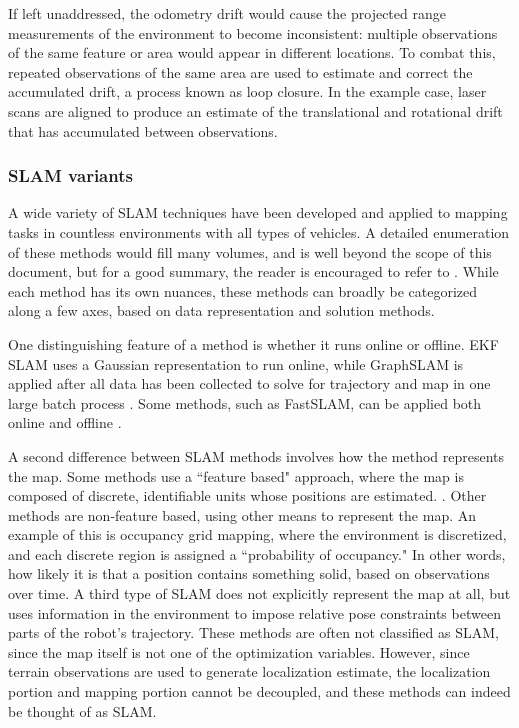 If left unaddressed, the odometry drift would cause the projected range measurements of the environment to become inconsistent: multiple observations of the same feature or area would appear in different locations. To combat this, repeated observations of the same area are used to estimate and correct the accumulated drift, a process known as loop closure. In the example case, laser scans are aligned to produce an estimate of the translational and rotational drift that has accumulated between observations. 


\subsubsection{SLAM variants}

A wide variety of SLAM techniques have been developed and applied to mapping tasks in countless environments with all types of vehicles. A detailed enumeration of these methods would fill many volumes, and is well beyond the scope of this document, but for a good summary, the reader is encouraged to refer to \cite{SLAMoverview}. While each method has its own nuances, these methods can broadly be categorized along a few axes, based on data representation and solution methods. 

One distinguishing feature of a method is whether it runs online or offline. EKF SLAM uses a Gaussian representation to run online, while GraphSLAM is applied after all data has been collected to solve for trajectory and map in one large batch process \cite{Thrun2005}. Some methods, such as FastSLAM, can be applied both online and offline \cite{Montemerlo2002}.

A second difference between SLAM methods involves how the method represents the map. Some methods use a ``feature based" approach, where the map is composed of discrete, identifiable units whose positions are estimated. \cite{?}. Other methods are non-feature based, using other means to represent the map. An example of this is occupancy grid mapping, where the environment is discretized, and each discrete region is assigned a ``probability of occupancy." In other words, how likely it is that a position contains something solid, based on observations over time.  A third type of SLAM does not explicitly represent the map at all, but uses information in the environment to impose relative pose constraints between parts of the robot's trajectory. These methods are often not classified as SLAM, since the map itself is not one of the optimization variables. However, since terrain observations are used to generate localization estimate,  the localization portion and mapping portion cannot be decoupled, and these methods can indeed be thought of as SLAM. 

